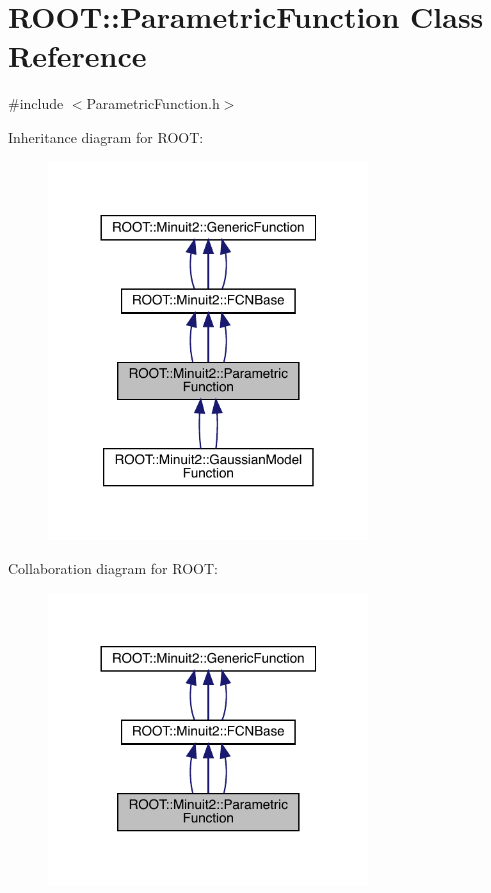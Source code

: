 \hypertarget{classROOT_1_1Minuit2_1_1ParametricFunction}{}\section{R\+O\+OT\+:\+:Parametric\+Function Class Reference}
\label{classROOT_1_1Minuit2_1_1ParametricFunction}


{\ttfamily \#include $<$Parametric\+Function.\+h$>$}



Inheritance diagram for R\+O\+OT\+:
\nopagebreak
\begin{figure}[H]
\begin{center}
\leavevmode
\includegraphics[width=240pt]{dc/d10/classROOT_1_1Minuit2_1_1ParametricFunction__inherit__graph}
\end{center}
\end{figure}


Collaboration diagram for R\+O\+OT\+:
\nopagebreak
\begin{figure}[H]
\begin{center}
\leavevmode
\includegraphics[width=240pt]{d8/dc4/classROOT_1_1Minuit2_1_1ParametricFunction__coll__graph}
\end{center}
\end{figure}
